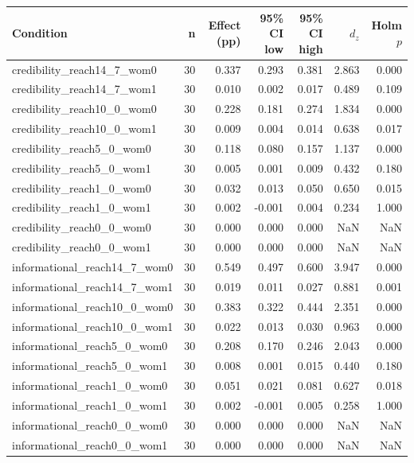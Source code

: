 \begin{tabular}{lrrrrrr}
\toprule
Condition & n & Effect (pp) & 95\% CI low & 95\% CI high & $d_z$ & Holm $p$ \\
\midrule
credibility_reach14_7_wom0 & 30 & 0.337 & 0.293 & 0.381 & 2.863 & 0.000 \\
credibility_reach14_7_wom1 & 30 & 0.010 & 0.002 & 0.017 & 0.489 & 0.109 \\
credibility_reach10_0_wom0 & 30 & 0.228 & 0.181 & 0.274 & 1.834 & 0.000 \\
credibility_reach10_0_wom1 & 30 & 0.009 & 0.004 & 0.014 & 0.638 & 0.017 \\
credibility_reach5_0_wom0 & 30 & 0.118 & 0.080 & 0.157 & 1.137 & 0.000 \\
credibility_reach5_0_wom1 & 30 & 0.005 & 0.001 & 0.009 & 0.432 & 0.180 \\
credibility_reach1_0_wom0 & 30 & 0.032 & 0.013 & 0.050 & 0.650 & 0.015 \\
credibility_reach1_0_wom1 & 30 & 0.002 & -0.001 & 0.004 & 0.234 & 1.000 \\
credibility_reach0_0_wom0 & 30 & 0.000 & 0.000 & 0.000 & NaN & NaN \\
credibility_reach0_0_wom1 & 30 & 0.000 & 0.000 & 0.000 & NaN & NaN \\
informational_reach14_7_wom0 & 30 & 0.549 & 0.497 & 0.600 & 3.947 & 0.000 \\
informational_reach14_7_wom1 & 30 & 0.019 & 0.011 & 0.027 & 0.881 & 0.001 \\
informational_reach10_0_wom0 & 30 & 0.383 & 0.322 & 0.444 & 2.351 & 0.000 \\
informational_reach10_0_wom1 & 30 & 0.022 & 0.013 & 0.030 & 0.963 & 0.000 \\
informational_reach5_0_wom0 & 30 & 0.208 & 0.170 & 0.246 & 2.043 & 0.000 \\
informational_reach5_0_wom1 & 30 & 0.008 & 0.001 & 0.015 & 0.440 & 0.180 \\
informational_reach1_0_wom0 & 30 & 0.051 & 0.021 & 0.081 & 0.627 & 0.018 \\
informational_reach1_0_wom1 & 30 & 0.002 & -0.001 & 0.005 & 0.258 & 1.000 \\
informational_reach0_0_wom0 & 30 & 0.000 & 0.000 & 0.000 & NaN & NaN \\
informational_reach0_0_wom1 & 30 & 0.000 & 0.000 & 0.000 & NaN & NaN \\
\bottomrule
\end{tabular}
